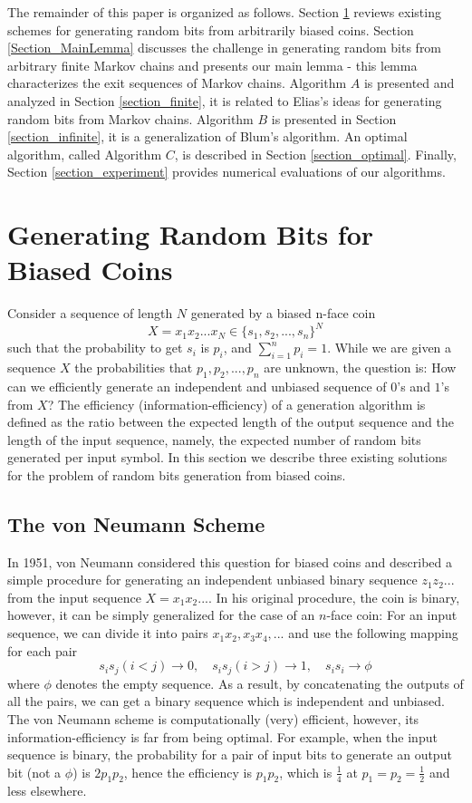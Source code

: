 \documentclass[journal]{IEEEtran}
\begin{document}
The remainder of this paper is organized as follows. Section \ref{Section_biasedcoin} reviews existing schemes for generating
random bits from arbitrarily biased coins. Section \ref{Section_MainLemma} discusses the challenge in generating random bits from arbitrary finite Markov chains and presents our main lemma - this lemma characterizes the exit sequences of Markov chains. Algorithm $A$ is presented and analyzed in Section \ref{section_finite}, it is related to Elias's ideas for generating random bits from Markov chains. Algorithm $B$ is presented in Section  \ref{section_infinite}, it is a generalization of Blum's algorithm.
An optimal algorithm, called Algorithm $C$, is described in Section \ref{section_optimal}. Finally, Section \ref{section_experiment} provides numerical evaluations of our algorithms.


\section{Generating Random Bits for Biased Coins}
\label{Section_biasedcoin}

Consider a sequence of length $N$ generated by a biased n-face coin
$$X=x_1x_2...x_N\in \{s_1,s_2,...,s_n\}^N$$
such that the probability to get $s_i$ is $p_i$, and $\sum_{i=1}^n p_i=1$.
While we are given a sequence $X$ the probabilities that $p_1,p_2,...,p_n$ are unknown, the question is: How can we efficiently generate an independent and unbiased sequence of $0$'s and $1$'s
from $X$? The efficiency (information-efficiency) of a generation algorithm is defined as the ratio between the
expected length of the output sequence and the length of the input sequence, namely, the expected number of random bits generated per input symbol. In this section we describe three existing solutions for the problem of random bits generation from biased coins.

\subsection{The von Neumann Scheme}

In 1951, von Neumann \cite{Neumann1951} considered this question for biased coins and described
a simple procedure for generating an independent unbiased binary sequence $z_1z_2...$ from the input sequence $X=x_1x_2...$. In his original procedure, the coin is binary, however, it can be simply generalized for the case of an $n$-face coin: For an input sequence, we can divide it into pairs $x_1x_2, x_3x_4, ...$ and use the following mapping for each pair
$$s_is_j(i<j)\rightarrow 0,\quad s_is_j(i>j)\rightarrow 1, \quad  s_is_i \rightarrow \phi$$
where $\phi$ denotes the empty sequence. As a result, by concatenating the outputs of all the pairs, we can get a binary sequence which is independent and unbiased.
The von Neumann scheme is computationally (very) efficient, however, its information-efficiency is far from being optimal. For example, when
the input sequence is binary, the probability for a pair of input bits to generate
an output bit (not a $\phi$) is $2p_1p_2$, hence the efficiency is $p_1p_2$, which
is $\frac{1}{4}$ at $p_1=p_2=\frac{1}{2}$ and less elsewhere.
\end{document}
